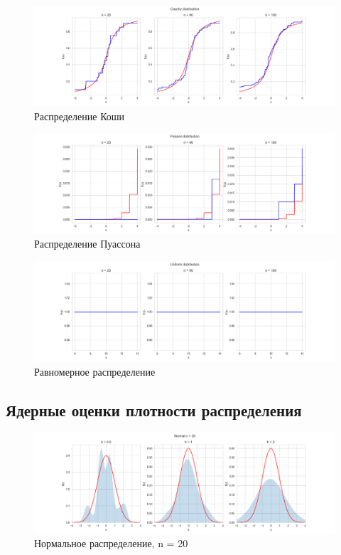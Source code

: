 \documentclass[../main.tex]{subfiles}
\begin{document}
    \begin{figure}[H]
        \centering
        \includegraphics[scale=0.5]{figures/CauchyEmpirical.png}
        \caption{Распределение Коши}
        \label{fig:normal}
    \end{figure}
    
    \begin{figure}[H]
        \centering
        \includegraphics[scale=0.5]{figures/PoissonEmpirical.png}
        \caption{Распределение Пуассона}
        \label{fig:normal}
    \end{figure}
    
    \begin{figure}[H]
        \centering
        \includegraphics[scale=0.5]{figures/UniformEmpirical.png}
        \caption{Равномерное распределение}
        \label{fig:normal}
    \end{figure}
    
    \subsection{Ядерные оценки плотности распределения}
    
    \begin{figure}[H]
        \centering
        \includegraphics[scale=0.5]{figures/NormalNuclear20.png}
        \caption{Нормальное распределение, n = 20}
        \label{fig:normal}
    \end{figure}
    
\end{document}

